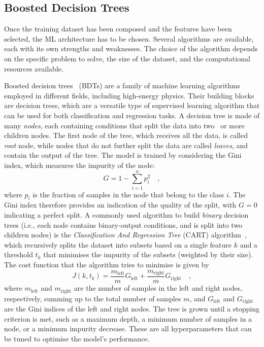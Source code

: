 \subsection{Boosted Decision Trees}
Once the training dataset has been composed and the features have been selected, the ML architecture has to be chosen. Several algorithms are available, each with its own strengths and weaknesses. The choice of the algorithm depends on the specific problem to solve, the size of the dataset, and the computational resources available. 

Boosted decision trees~\cite{friedman2001greedy,freund1997decision} (BDTs) are a family of machine learning algorithms employed in different fields, including high-energy physics. Their building blocks are decision trees, which are a versatile type of supervised learning algorithm that can be used for both classification and regression tasks. A decision tree is made of many \emph{nodes}, each containing conditions that split the data into two~\cite{breiman2017classification} or more~\cite{quinlan1986induction} children nodes. The first node of the tree, which receives all the data, is called \emph{root} node, while nodes that do not further split the data are called \emph{leaves}, and contain the output of the tree. The model is trained by considering the Gini index, which measures the impurity of the node:
\begin{equation*}
    G = 1 - \sum_{i=1}^{n} p_{i}^{2}\quad ,
\end{equation*}
where $p_{i}$ is the fraction of samples in the node that belong to the class $i$. The Gini index therefore provides an indication of the quality of the split, with $G=0$ indicating a perfect split. A commonly used algorithm to build \emph{binary} decision trees (i.e., each node contains binary-output conditions, and is split into two children nodes) is the \emph{Classification And Regression Tree} (CART) algorithm~\cite{breiman2017classification}, which recursively splits the dataset into subsets based on a single feature $k$ and a threshold $t_k$ that minimises the impurity of the subsets (weighted by their size). The cost function that the algorithm tries to minimise is given by
\begin{equation*}
    J(k,t_k) = \frac{m_{\mathrm{left}}}{m}G_{\mathrm{left}} + \frac{m_{\mathrm{right}}}{m}G_{\mathrm{right}}\quad ,
\end{equation*}
where $m_{\mathrm{left}}$ and $m_{\mathrm{right}}$ are the number of samples in the left and right nodes, respectively, summing up to the total number of samples $m$, and $G_{\mathrm{left}}$ and $G_{\mathrm{right}}$ are the Gini indices of the left and right nodes. The tree is grown until a stopping criterion is met, such as a maximum depth, a minimum number of samples in a node, or a minimum impurity decrease. These are all hyperparameters that can be tuned to optimise the model's performance.

